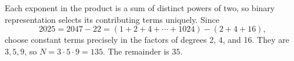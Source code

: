 Each exponent in the product is a sum of distinct powers of two, so binary representation selects its contributing terms uniquely. Since
\[2025=2047-22=(1+2+4+\cdots+1024)-(2+4+16),\]
choose constant terms precisely in the factors of degrees 2, 4, and 16. They are $3,5,9$, so $N=3\cdot5\cdot9=135$. The remainder is $\boxed{35}$.
